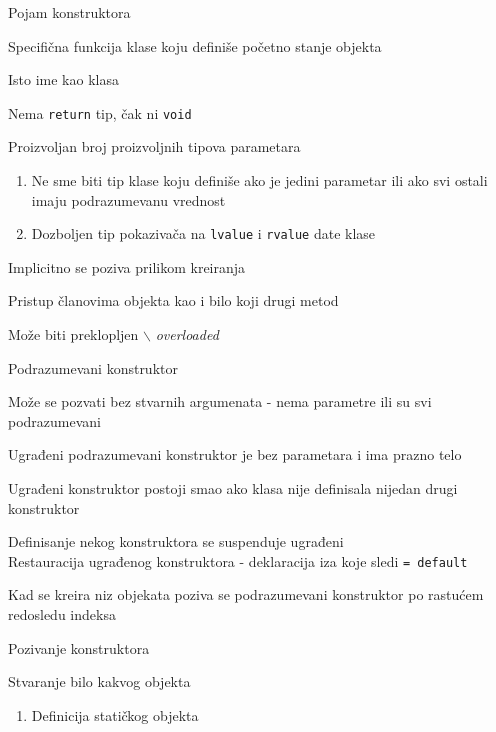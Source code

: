 \documentclass{article}
\newenvironment{xitemize}{%
    
    \itemize
    \larger
}{%
    \enditemize
}
\let\olditemize\itemize
\let\endolditemize\enditemize
\renewenvironment{itemize}{%
    \smaller
    \olditemize
}{%
    \endolditemize
}
\providecommand{\inlinecode}[1]{\texttt{#1}}
\begin{document}
\begin{xitemize}
\item Pojam konstruktora
\begin{itemize}
    \item Specifična funkcija klase koju definiše početno stanje objekta
    \item Isto ime kao klasa
    \item Nema \inlinecode{return} tip, čak ni \inlinecode{void}
    \item Proizvoljan broj proizvoljnih tipova parametara
    \begin{enumerate}
        \item Ne sme biti tip klase koju definiše ako je jedini parametar ili ako svi ostali imaju podrazumevanu vrednost
        \item Dozboljen tip pokazivača na \inlinecode{lvalue} i \inlinecode{rvalue} date klase
    \end{enumerate}
    \item Implicitno se poziva prilikom kreiranja
    \item Pristup članovima objekta kao i bilo koji drugi metod
    \item Može biti preklopljen $\backslash$ \textit{overloaded}
\end{itemize}
\item Podrazumevani konstruktor
\begin{itemize}
    \item Može se pozvati bez stvarnih argumenata - nema parametre ili su svi podrazumevani
    \item Ugrađeni podrazumevani konstruktor je bez parametara i ima prazno telo
    \item Ugrađeni konstruktor postoji smao ako klasa nije definisala nijedan drugi konstruktor
    \item Definisanje nekog konstruktora se suspenduje ugrađeni\\
    Restauracija ugrađenog konstruktora - deklaracija iza koje sledi \inlinecode{= default}
    \item Kad se kreira niz objekata poziva se podrazumevani konstruktor po rastućem redosledu indeksa
\end{itemize}
\newpage
\item Pozivanje konstruktora
\begin{itemize}
    \item Stvaranje bilo kakvog objekta
\end{itemize}
\begin{enumerate}
    \item Definicija statičkog objekta

\end{enumerate}
\end{xitemize}
\end{document}
